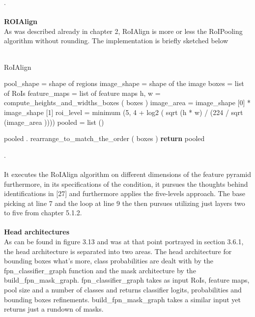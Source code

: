   .\\
  \\
\clearpage
 \textbf{ROIAlign}
\\
As was described already in chapter 2, RoIAlign is more or less the RoIPooling algorithm without rounding. The implementation is briefly sketched below
\\
\\
\begin{algorithm}[H]
  \caption{RoIAlign}
  \SetAlgoLined
  \DontPrintSemicolon
pool\_shape = shape of regions\;
 image\_shape = shape of the image\;
 boxes = list of RoIs\;
 feature\_maps = list of feature maps\;
 h, w = compute\_heights\_and\_widths\_boxes ( boxes )\;
 image\_area = image\_shape [0] * image\_shape [1]\;
 roi\_level = minimum (5, 4 + log2 ( sqrt (h * w) / (224 / sqrt (image\_area ))))\;
pooled = list ()\;

pooled . rearrange\_to\_match\_the\_order ( boxes )\;
\textbf{return} pooled\;
\end{algorithm}
.\\
\\
It executes the RoIAlign algorithm on different dimensions of the feature pyramid furthermore, in its specifications of the \newcommand*{\logten}{\mathop{\log_{2}}} condition, it pursues the thoughts behind identifications in [27] and furthermore applies the five-levels approach. The base picking at line 7 and the loop at line 9 the then pursues utilizing just layers two to five from chapter 5.1.2.
\\
\\
\textbf{Head architectures}
\\
As can be found in figure 3.13 and was at that point portrayed in section 3.6.1, the head architecture is separated into two areas. The head architecture for bounding boxes what's more, class probabilities are dealt with by the fpn\_classifier\_graph function and the mask architecture by the build\_fpn\_mask\_graph. 
fpn\_classifier\_graph takes as input RoIs, feature maps, pool size and a number of classes and returns classifier logits, probabilities and bounding boxes refinements. build\_fpn\_mask\_graph takes a similar input yet returns just a rundown of masks.
\\
